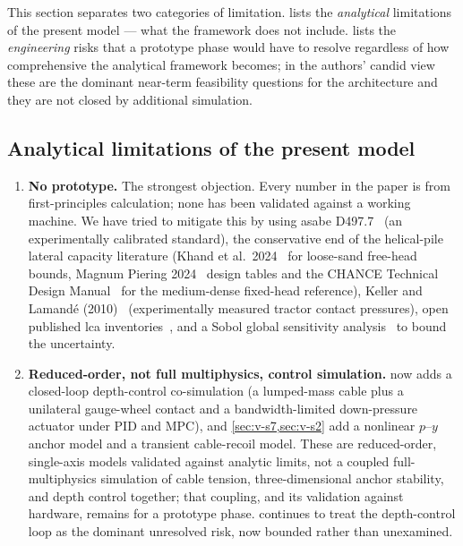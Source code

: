 \documentclass[11pt,a4paper]{article}
\begin{document}
This section separates two categories of limitation.  lists the \emph{analytical} limitations of the present model --- what the framework does not include.  lists the \emph{engineering} risks that a prototype phase would have to resolve regardless of how comprehensive the analytical framework becomes; in the authors' candid view these are the dominant near-term feasibility questions for the architecture and they are not closed by additional simulation.

\subsection{Analytical limitations of the present model}\label{sec:analytical-limitations}

\begin{enumerate}[leftmargin=1.8em,itemsep=0.2em]
    \item \textbf{No prototype.} The strongest objection. Every number in the paper is from first-principles calculation; none has been validated against a working machine. We have tried to mitigate this by using \gls{asabe} D497.7~\cite{asabe-d497} (an experimentally calibrated standard), the conservative end of the helical-pile lateral capacity literature (Khand et al.\ 2024~\cite{khand2024helical} for loose-sand free-head bounds, Magnum Piering 2024~\cite{magnum2024fixed} design tables and the CHANCE Technical Design Manual~\cite{chance2024manual} for the medium-dense fixed-head reference), Keller and Lamand\'e (2010)~\cite{keller2010compaction} (experimentally measured tractor contact pressures), open published \gls{lca} inventories~\cite{hammond2019ice,emilsson2019battery,fraunhoferise2022pv,hawkins2013ev,defra2023factors,eea2023electricity}, and a Sobol global sensitivity analysis~\cite{sobol2001indices,saltelli2008primer,herman2017salib} to bound the uncertainty.
    \item \textbf{Reduced-order, not full multiphysics, control simulation.}  now adds a closed-loop depth-control co-simulation (a lumped-mass cable plus a unilateral gauge-wheel contact and a bandwidth-limited down-pressure actuator under PID and MPC), and \cref{sec:v-s7,sec:v-s2} add a nonlinear $p$--$y$ anchor model and a transient cable-recoil model. These are reduced-order, single-axis models validated against analytic limits, not a coupled full-multiphysics simulation of cable tension, three-dimensional anchor stability, and depth control together; that coupling, and its validation against hardware, remains for a prototype phase.  continues to treat the depth-control loop as the dominant unresolved risk, now bounded rather than unexamined.

\end{enumerate}
\end{document}
